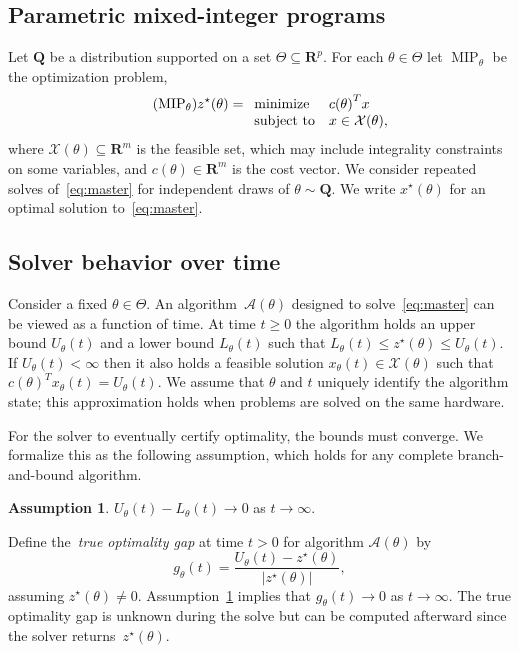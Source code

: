 \documentclass[12pt]{article}
\newtheorem{assumption}[theorem]{Assumption}
\theoremstyle{definition}
\theoremstyle{remark}
\newcommand{\paramdist}{\mathbf{Q}}
\newcommand{\paramspace}{\Theta}
\newcommand{\param}{\theta}
\newcommand{\reals}{\mathbf{R}}
\newcommand{\MIP}{\operatorname{MIP}}
\newcommand{\UB}{U}
\newcommand{\LB}{L}
\newcommand{\ov}{z^\star}
\newcommand{\varspace}{\mathcal{X}}
\newcommand{\vars}{x}
\newcommand{\transpose}{T}
\newcommand{\algo}{\mathcal{A}}
\newcommand{\truegap}{g}
\newcommand{\paramdist}{\mathbf{Q}}
\newcommand{\paramspace}{\Theta}
\newcommand{\param}{\theta}
\newcommand{\reals}{\mathbf{R}}
\newcommand{\MIP}{\operatorname{MIP}}
\newcommand{\UB}{U}
\newcommand{\LB}{L}
\newcommand{\ov}{z^\star}
\newcommand{\varspace}{\mathcal{X}}
\newcommand{\vars}{x}
\newcommand{\transpose}{T}
\newcommand{\algo}{\mathcal{A}}
\newcommand{\truegap}{g}
\theoremstyle{plain}
\theoremstyle{definition}
\newtheorem{assumption}[theorem]{Assumption}
\theoremstyle{remark}
\begin{document}
\subsection{Parametric mixed-integer programs} \label{sec:parametric}
Let $\paramdist$ be a distribution supported on a set $\paramspace \subseteq \reals^p$.
For each $\param \in \paramspace$ let $\MIP_\param$ be the optimization problem,
\begin{equation} \label{eq:master} \tag{$\MIP_\param$}
    \ov(\param) = \begin{array}[t]{ll}
         \text{minimize}  & {c(\param)}^\transpose \vars \\
         \text{subject to} & \vars \in \varspace(\param),
    \end{array}
\end{equation}
where $\varspace(\param) \subseteq \reals^m$ is the feasible set, which may include integrality constraints on some variables, and $c(\param) \in \reals^m$ is the cost vector.
We consider repeated solves of~\eqref{eq:master} for independent draws of $\param \sim \paramdist$.
We write $\vars^\star(\param)$ for an optimal solution to~\eqref{eq:master}.

\subsection{Solver behavior over time} \label{sec:solver-time}
Consider a fixed $\param \in \paramspace$.
An algorithm~$\algo(\param)$ designed to solve~\eqref{eq:master} can be viewed as a function of time.
At time $t \geq 0$ the algorithm holds an upper bound $\UB_\param(t)$ and a lower bound $\LB_\param(t)$ such that $\LB_\param(t) \le \ov(\param) \le \UB_\param(t)$.
If $\UB_\param(t) < \infty$ then it also holds a feasible solution $\vars_\param(t) \in \varspace(\param)$ such that $c(\param)^\transpose \vars_\param(t) = \UB_\param(t).$
We assume that $\param$ and $t$ uniquely identify the algorithm state; this approximation holds when problems are solved on the same hardware.

For the solver to eventually certify optimality, the bounds must converge.
We formalize this as the following assumption, which holds for any complete branch-and-bound algorithm.
\begin{assumption} \label{ass:terminal}
    $\UB_\param(t) - \LB_\param(t) \rightarrow 0$ as $t \rightarrow \infty$.
\end{assumption}
Define the~\emph{true optimality gap} at time $t > 0$ for algorithm $\algo(\param)$ by
\begin{equation*}
    \truegap_\param(t) = \frac{\UB_\param(t) - \ov(\param)}{|\ov(\param)|},
\end{equation*}
assuming $\ov(\param) \neq 0$.
Assumption~\ref{ass:terminal} implies that $\truegap_\param(t) \rightarrow 0$ as $t \rightarrow \infty$.
The true optimality gap is unknown during the solve but can be computed afterward since the solver returns~$\ov(\param)$.
\end{document}

